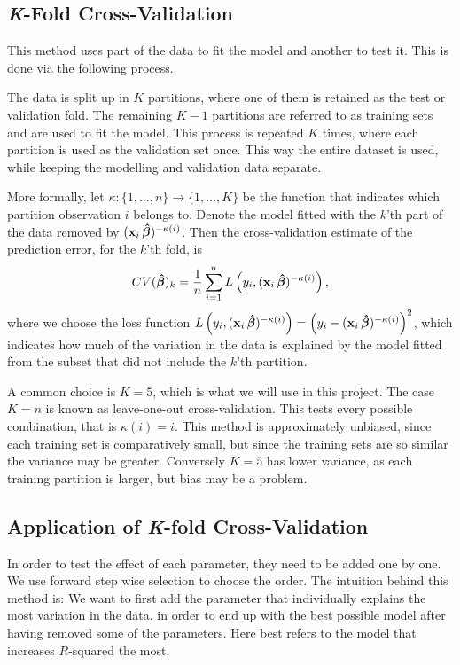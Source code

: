 \subsection{\textit{K}-Fold Cross-Validation} 

This method uses part of the data to fit the model and another to test it. This is done via the following process.

The data is split up in $K$ partitions, where one of them is retained as the test or validation fold. 
The remaining $K-1$ partitions are referred to as training sets and are used to fit the model.
This process is repeated $K$ times, where each partition is used as the validation set once. 
This way the entire dataset is used, while keeping the modelling and validation data separate. 

More formally, let $\kappa: \{1, \ldots, n\} \rightarrow \{1, \ldots, K\}$ be the function that indicates which partition observation $i$ belongs to. 
Denote the model fitted with the $k$'th part of the data removed by $(\textbf{x}_i \operatorname{\boldsymbol{\hat{\beta}}})^{-\kappa(i)}$. 
Then the cross-validation estimate of the prediction error, for the $k$'th fold, is 
\begin{align*}
    CV(\operatorname{\boldsymbol{\hat{\beta}}})_k = \frac{1}{n} \sum_{i=1}^n L\left(y_i, (\textbf{x}_i \operatorname{\boldsymbol{\hat{\beta}}})^{-\kappa(i)}\right),
\end{align*}
where we choose the loss function $L\left(y_i, (\textbf{x}_i \operatorname{\boldsymbol{\hat{\beta}}})^{-\kappa(i)}\right)=\left(y_i - (\textbf{x}_i \operatorname{\boldsymbol{\hat{\beta}}})^{-\kappa(i)}\right)^2$, which indicates how much of the variation in the data is explained by the model fitted from the subset that did not include the $k$'th partition. 

A common choice is $K = 5$, which is what we will use in this project. 
The case $K = n$ is known as leave-one-out cross-validation. 
This tests every possible combination, that is $\kappa(i) = i$. 
This method is approximately unbiased, since each training set is comparatively small, but since the training sets are so similar the variance may be greater. 
Conversely $K=5$ has lower variance, as each training partition is larger, but bias may be a problem. 


\subsection{Application of \textit{K}-fold Cross-Validation}
In order to test the effect of each parameter, they need to be added one by one. 
We use forward step wise selection to choose the order. The intuition behind this method is:
We want to first add the parameter that individually explains the most variation in the data, in order to end up with the best possible model after having removed some of the parameters.
Here best refers to the model that increases $R$-squared the most.

